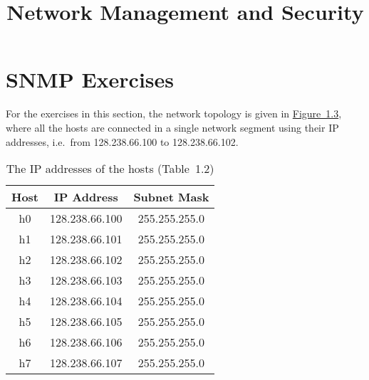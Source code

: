 \documentclass{../UTNetLab}
\title{Network Management and Security}
\begin{document}
\part{SNMP Exercises}
    For the exercises in this section, the network topology is given in \hyperref[fig:1.3]{Figure~1.3}, where all the hosts are connected in a single network segment using their IP addresses, i.e.\  from 128.238.66.100 to 128.238.66.102.

    \begin{center}
        \begin{minipage}{0.48\textwidth}
            \begin{flushleft}
                \begin{table}[H]
                    \caption{The IP addresses of the hosts (Table~1.2)}
                    \centering
                    \begin{tabular}{ c c c }
                        \hline \hline
                        Host & IP Address & Subnet Mask \\
                        \hline 
                        h0 & 128.238.66.100 & 255.255.255.0 \\
                        h1 & 128.238.66.101 & 255.255.255.0 \\
                        h2 & 128.238.66.102 & 255.255.255.0 \\
                        h3 & 128.238.66.103 & 255.255.255.0 \\
                        h4 & 128.238.66.104 & 255.255.255.0 \\
                        h5 & 128.238.66.105 & 255.255.255.0 \\
                        h6 & 128.238.66.106 & 255.255.255.0 \\
                        h7 & 128.238.66.107 & 255.255.255.0 \\
                        \hline \hline
                        \end{tabular}
                \end{table}
            \end{flushleft}
        \end{minipage}
        \begin{minipage}{0.48\textwidth}
            \begin{flushright}
                \begin{figure}[H]
                    \centering
\end{figure}
\end{flushright}
\end{minipage}
\end{center}
\end{document}
